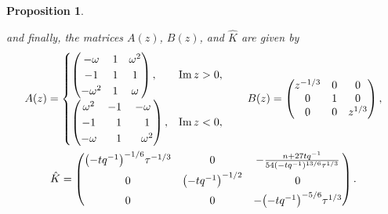 \documentclass[pdftex]{sigma}
\numberwithin{equation}{section}
\newtheorem{Proposition}[Theorem]{Proposition}
 { \theoremstyle{definition}
\newtheorem{Definition}[Theorem]{Definition}
\newtheorem{Note}[Theorem]{Note}
\newtheorem{Example}[Theorem]{Example}
\newtheorem{Remark}[Theorem]{Remark} }
\begin{document}
\begin{Proposition}
\begin{enumerate}
and finally, the matrices $A(z)$, $B(z)$, and $\hat{K}$ are given by
 \begin{gather*}
 A(z) =
 \begin{cases}
 \begin{pmatrix}
 -\omega & 1 & \omega^2\\
 -1 & 1 & 1\\
 -\omega^2 & 1 & \omega
 \end{pmatrix}, & \operatorname{Im} z > 0,\\[2.5mm]
 \begin{pmatrix}
 \omega^2 & -1 & -\omega\\
 -1 & \hphantom{-}1 & \hphantom{-}1\\
 -\omega & \hphantom{-}1 & \hphantom{-}\omega^2\\
 \end{pmatrix}, & \operatorname{Im} z < 0,
 \end{cases}
 \qquad
 B(z) =
 \begin{pmatrix}
 z^{-1/3} & 0 & 0\\
 0 & 1 & 0\\
 0 & 0 & z^{1/3}
 \end{pmatrix},
 \\
 \hat{K} =
 \begin{pmatrix}
 \bigl(-tq^{-1}\bigr)^{-1/6}\tau^{-1/3} & 0 & -\frac{n+27 tq^{-1}}{54(-tq^{-1})^{13/6}\tau^{1/3}}\\[1.4mm]
 0 & \bigl(-tq^{-1}\bigr)^{-1/2} & 0\\[1.1mm]
 0 & 0 & -\bigl(-tq^{-1}\bigr)^{-5/6}\tau^{1/3}
 \end{pmatrix}.
 \end{gather*}
 \end{enumerate}
 \end{Proposition}
\end{document}

